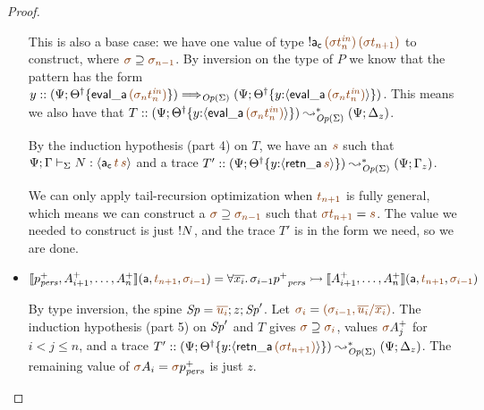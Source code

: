\begin{proof}
\begin{itemize}
  \medskip
  This is also a base case: we have one value of type 
  ${!}{\sf a_c}\,\lf{({\sigma}t^{\it in}_n)}\,\lf{({\sigma}t_{n+1})}$ to construct, where
  $\lf{\sigma} \supseteq \lf{\sigma_{n-1}}$. By inversion on the type of
  $P$ we know that the pattern has the form 
  $y :: (\Psi; \tackon{\opsubst{\Theta}}{{\sf eval\_a}\,\lf{(\sigma_{n}{t^{\it in}_{n}})}}) \Longrightarrow_{\transop{\Sigma}}
     (\Psi; \tackon{\opsubst{\Theta}}
            {y{:}\susp{{\sf eval\_a}\,\lf{(\sigma_{n}{t^{\it in}_{n}})}}})$.
  This means we also have 
  that $T :: (\Psi; \tackon{\opsubst{\Theta}}
            {y{:}\susp{{\sf eval\_a}\,\lf{(\sigma_{n}{t^{\it in}_{n}})}}})
    \leadsto^*_{\transop{\Sigma}}
 (\Psi; \Delta_z)$.

  \smallskip
  By the induction hypothesis (part 4) on $T$, we have an $\lf{s}$ such
  that $\slst{\Sigma}{\Psi}{\Gamma}{N}{\susp{{\sf a_c}\,\lf{t}\,\lf{s}}}$ and a 
  trace
  $T' :: (\Psi; \tackon{\opsubst{\Theta}}{y{:}\susp{{\sf retn\_a}\,\lf{s}}}) 
   \leadsto^*_{\transop{\Sigma}}
  (\Psi; \Gamma_z)$. 


  \smallskip
  We can only apply tail-recursion optimization when $\lf{t_{n+1}}$ is 
  fully general, which means we can construct
  a $\lf{\sigma} \supseteq \lf{\sigma_{n-1}}$ such that $\lf{\sigma{t_{n+1}}} = \lf{s}$. The value we needed to construct is just 
  ${!}{{N}}$, and the trace $T'$ is in the form we need,
  so we are done.
  \medskip

\item $\opbasic{p^+_\mpers,A^+_{i+1},\ldots,A^+_n}{t_{n+1}}{\sigma_{i-1}} 
  = \forall \overline{x_i}.\, \sigma_{i-1}{p^+}_\mpers \lefti \opbasic{A^+_{i+1},\ldots,A^+_n}{t_{n+1}}{\sigma_{i-1}}$
 
  \medskip
  By type inversion, the spine
  $\Sp = \lf{\overline{u_i}}; z; \Sp'$.
  Let $\lf{\sigma_i} = \lf{(\sigma_{i-1},\overline{u_i}/\overline{x_i})}$. The
  induction hypothesis (part 5) on ${\it Sp}'$ and $T$
  gives $\lf{\sigma} \supseteq \lf{\sigma_{i}}$, values
  $\lf\sigma{A^+_{j}}$ for $i < j \leq n$, and 
  a trace $T' :: (\Psi; \tackon{\opsubst{\Theta}}{y{:}\susp{{\sf retn\_a}\,\lf{(\sigma t_{n+1})}}})
  \leadsto^*_{\transop{\Sigma}}
 (\Psi; \Delta_z)$. The remaining value of $\lf\sigma A_i = \lf\sigma{p^+_\mpers}$
  is just $z$.
  \medskip


\end{itemize}
\end{proof}
